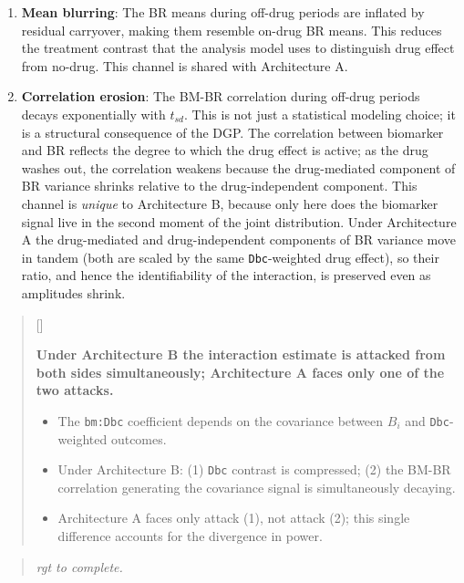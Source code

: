 \documentclass[
  11pt,
]{article}
\newcounter{pgraph}
\newenvironment{bullets}{%
  \stepcounter{pgraph}%
  \begin{quote}\small\sffamily\color[gray]{0.30}%
  {\normalfont\scriptsize\color[gray]{0.58}[\thepgraph]\enspace}}{%
  \end{quote}}
\newenvironment{rgt}{%
  \begin{quote}\small\itshape\color[RGB]{20,60,160}}{%
  \end{quote}}
\begin{document}
\begin{enumerate}
\item \textbf{Mean blurring}: The BR means during off-drug periods are
  inflated by residual carryover, making them resemble on-drug
  BR means. This reduces the treatment contrast that the analysis
  model uses to distinguish drug effect from no-drug. This channel
  is shared with Architecture A.

\item \textbf{Correlation erosion}: The BM-BR correlation during off-drug
  periods decays exponentially with $t_{sd}$. This is not just a
  statistical modeling choice; it is a structural consequence
  of the DGP. The correlation between biomarker and BR reflects
  the degree to which the drug effect is active; as the drug
  washes out, the correlation weakens because the drug-mediated
  component of BR variance shrinks relative to the
  drug-independent component. This channel is \emph{unique} to
  Architecture B, because only here does the biomarker signal
  live in the second moment of the joint distribution. Under
  Architecture A the drug-mediated and drug-independent
  components of BR variance move in tandem (both are scaled by
  the same \texttt{Dbc}-weighted drug effect), so their ratio,
  and hence the identifiability of the interaction, is preserved
  even as amplitudes shrink.
\end{enumerate}

\begin{bullets}

\textbf{Under Architecture B the interaction estimate is
attacked from both sides simultaneously; Architecture A faces
only one of the two attacks.}

\begin{itemize}\setlength{\itemsep}{2pt}\setlength{\parskip}{0pt}
\item The \texttt{bm:Dbc} coefficient depends on the covariance
  between $B_i$ and \texttt{Dbc}-weighted outcomes.
\item Under Architecture B: (1) \texttt{Dbc} contrast is
  compressed; (2) the BM-BR correlation generating the
  covariance signal is simultaneously decaying.
\item Architecture A faces only attack (1), not attack (2);
  this single difference accounts for the divergence in power.
\end{itemize}

\end{bullets}

\begin{rgt}
rgt to complete.

\end{rgt}
\end{document}
